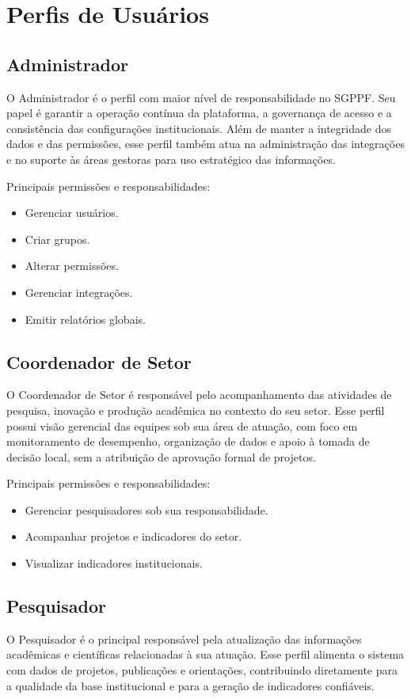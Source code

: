 \documentclass[12pt,a4paper]{article}
\begin{document}
\section{Perfis de Usuários}
\subsection{Administrador}
O Administrador é o perfil com maior nível de responsabilidade no SGPPF. Seu papel é garantir a operação contínua da plataforma, a governança de acesso e a consistência das configurações institucionais. Além de manter a integridade dos dados e das permissões, esse perfil também atua na administração das integrações e no suporte às áreas gestoras para uso estratégico das informações.

Principais permissões e responsabilidades:
\begin{itemize}[leftmargin=*]
  \item Gerenciar usuários.
  \item Criar grupos.
  \item Alterar permissões.
  \item Gerenciar integrações.
  \item Emitir relatórios globais.
\end{itemize}

\subsection{Coordenador de Setor}
O Coordenador de Setor é responsável pelo acompanhamento das atividades de pesquisa, inovação e produção acadêmica no contexto do seu setor. Esse perfil possui visão gerencial das equipes sob sua área de atuação, com foco em monitoramento de desempenho, organização de dados e apoio à tomada de decisão local, sem a atribuição de aprovação formal de projetos.

Principais permissões e responsabilidades:
\begin{itemize}[leftmargin=*]
  \item Gerenciar pesquisadores sob sua responsabilidade.
  \item Acompanhar projetos e indicadores do setor.
  \item Visualizar indicadores institucionais.
\end{itemize}

\subsection{Pesquisador}
O Pesquisador é o principal responsável pela atualização das informações acadêmicas e científicas relacionadas à sua atuação. Esse perfil alimenta o sistema com dados de projetos, publicações e orientações, contribuindo diretamente para a qualidade da base institucional e para a geração de indicadores confiáveis.
\end{document}
